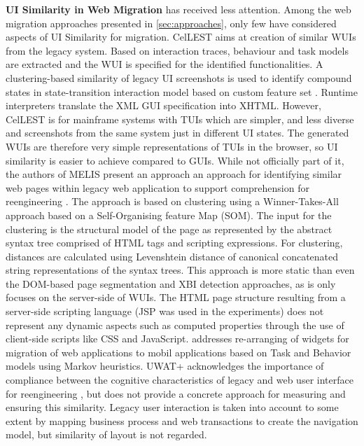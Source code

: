 \textbf{UI Similarity in Web Migration} has received less attention.
Among the web migration approaches presented in \cref{sec:approaches}, only few have considered aspects of UI Similarity for migration.
CelLEST \autocite{Stroulia2003,Stroulia2002,Stroulia2002Book,El-Ramly2002,Stroulia1999,Kong1999} aims at creation of similar WUIs from the legacy system.
Based on interaction traces, behaviour and task models are extracted and the WUI is specified for the identified functionalities.
A clustering-based similarity of legacy UI screenshots is used to identify compound states in state-transition interaction model \autocite{Stroulia2002} based on custom feature set \autocite{Stroulia1999}.
Runtime interpreters translate the XML GUI specification into XHTML.
However, CelLEST is for mainframe systems with TUIs which are simpler, and less diverse and screenshots from the same system just in different UI states.
The generated WUIs are therefore very simple representations of TUIs in the browser, so UI similarity is easier to achieve compared to GUIs.
While not officially part of it, the authors of MELIS present an approach an approach for identifying similar web pages within legacy web application to support comprehension for reengineering \autocite{Lucia2007SimilarPages}.
The approach is based on clustering using a Winner-Takes-All approach based on a Self-Organising feature Map (SOM).
The input for the clustering is the structural model of the page as represented by the abstract syntax tree comprised of HTML tags and scripting expressions.
For clustering, distances are calculated using Levenshtein distance of canonical concatenated string representations of the syntax trees.
This approach is more static than even the DOM-based page segmentation and XBI detection approaches, as is only focuses on the server-side of WUIs.
The HTML page structure resulting from a server-side scripting language (JSP was used in the experiments) does not represent any dynamic aspects such as computed properties through the use of client-side scripts like CSS and JavaScript.
\autocite{Cajas2019} addresses re-arranging of widgets for migration of web applications to mobil applications based on Task and Behavior models using Markov heuristics.
UWAT+ acknowledges the importance of compliance between the cognitive characteristics of legacy and web user interface for reengineering \autocite{Distante2006a}, but does not provide a concrete approach for measuring and ensuring this similarity.
Legacy user interaction is taken into account to some extent by mapping business process and web transactions to create the navigation model, but similarity of layout is not regarded.

